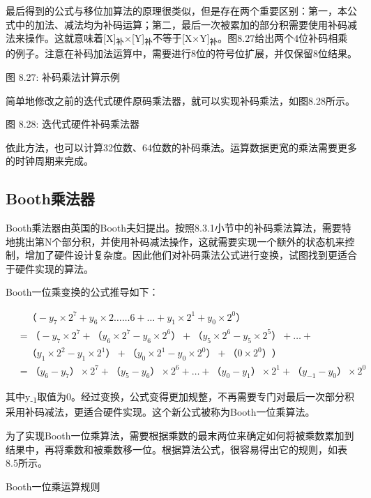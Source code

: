 \documentclass[]{ctexbook}
\begin{document}
最后得到的公式与移位加算法的原理很类似，但是存在两个重要区别：第一，本公式中的加法、减法均为补码运算；第二，最后一次被累加的部分积需要使用补码减法来操作。这就意味着{[}X{]}\textsubscript{补}×{[}Y{]}\textsubscript{补}不等于{[}X×Y{]}\textsubscript{补}。图8.27给出两个4位补码相乘的例子。注意在补码加法运算中，需要进行8位的符号位扩展，并仅保留8位结果。

图 8.27: 补码乘法计算示例

简单地修改之前的迭代式硬件原码乘法器，就可以实现补码乘法，如图8.28所示。

图 8.28: 迭代式硬件补码乘法器

依此方法，也可以计算32位数、64位数的补码乘法。运算数据更宽的乘法需要更多的时钟周期来完成。

\hypertarget{boothux4e58ux6cd5ux5668}{%
\subsection{Booth乘法器}\label{boothux4e58ux6cd5ux5668}}

Booth乘法器由英国的Booth夫妇提出。按照8.3.1小节中的补码乘法算法，需要特地挑出第N个部分积，并使用补码减法操作，这就需要实现一个额外的状态机来控制，增加了硬件设计复杂度。因此他们对补码乘法公式进行变换，试图找到更适合于硬件实现的算法。

Booth一位乘变换的公式推导如下：

\[\begin{aligned}&\quad（-y_{7}\times 2^{7}+y_{6}\times 2……{6}+\ldots +y_{1}\times 2^{1}+y_{0}\times 2^{0}）\\
&=（-y_{7}\times 2^{7}+（y_{6}\times 2^{7}-y_{6}\times 2^{6}）+（y_{5}\times 2^{6}-y_{5}\times 2^{5}）+\ldots + \\ &\quad（y_{1}\times 2^{2}-y_{1}\times 2^{1}）+（y_{0}\times 2^{1}-y_{0}\times 2^{0}）+（0\times 2^{0}））\\
&=（y_{6}-y_{7}）\times 2^{7}+（y_{5}-y_{6}）\times 2^{6}+\ldots +（y_{0}-y_{1}）\times 2^{1}+（y_{-1}-y_{0}）\times 2^{0}\end{aligned}\]

其中y\textsubscript{-1}取值为0。经过变换，公式变得更加规整，不再需要专门对最后一次部分积采用补码减法，更适合硬件实现。这个新公式被称为Booth一位乘算法。

为了实现Booth一位乘算法，需要根据乘数的最末两位来确定如何将被乘数累加到结果中，再将乘数和被乘数移一位。根据算法公式，很容易得出它的规则，如表8.5所示。

\label{tab:booth-one-mul-rule}Booth一位乘运算规则
\end{document}
